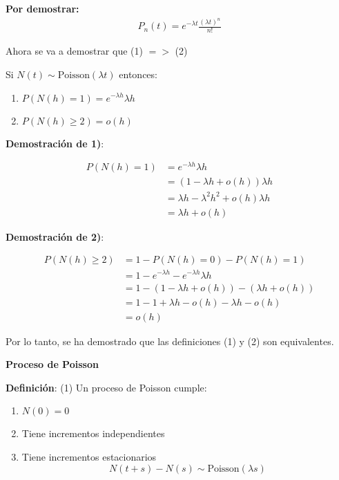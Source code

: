 \documentclass[12pt,a4paper]{article}
\newcommand{\definicion}[1]{%
\begin{definicionbox}
\textbf{Definición}: #1
\end{definicionbox}
}
\begin{document}
\textbf{Por demostrar:}
\begin{align*}
P_n(t) = e^{-\lambda t} \frac{(\lambda t)^n}{n!}
\end{align*}

Ahora se va a demostrar que (1) $= >$ (2)

Si $N(t) \sim \text{Poisson}(\lambda t)$ entonces:

\begin{enumerate}
    \item $P(N(h)=1) = e^{-\lambda h} \lambda h$
    \item $P(N(h) \geq 2) = o(h)$
\end{enumerate}

\textbf{Demostración de 1)}:

\begin{align*}
P(N(h)=1) &= e^{-\lambda h} \lambda h \\
&= (1 - \lambda h + o(h)) \lambda h \\
&= \lambda h - \lambda^2 h^2 + o(h) \lambda h \\
&= \lambda h + o(h)
\end{align*}

\textbf{Demostración de 2)}:

\begin{align*}
P(N(h) \geq 2) &= 1 - P(N(h)=0) - P(N(h)=1) \\
&= 1 - e^{-\lambda h} - e^{-\lambda h} \lambda h \\
&= 1 - (1 - \lambda h + o(h)) - (\lambda h + o(h)) \\
&= 1 - 1 + \lambda h - o(h) - \lambda h - o(h) \\
&= o(h)
\end{align*}

Por lo tanto, se ha demostrado que las definiciones (1) y (2) son equivalentes.


\textbf{Proceso de Poisson}

\definicion{
(1) Un proceso de Poisson cumple:
\begin{enumerate}
    \item $N(0) = 0$
    \item Tiene incrementos independientes
    \item Tiene incrementos estacionarios
    \begin{equation*}
    N(t+s) - N(s) \sim \text{Poisson}(\lambda s)
    \end{equation*}
\end{enumerate}
}
\end{document}
